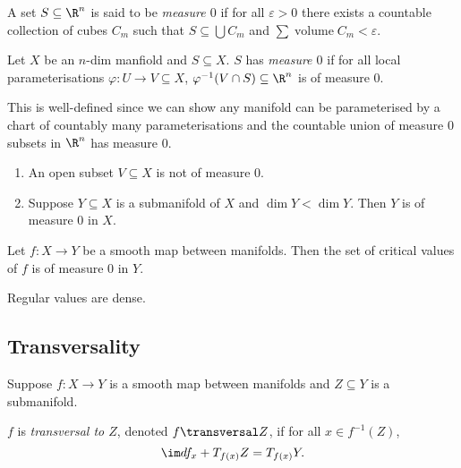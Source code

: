 \documentclass[a4paper]{article}
\begin{document}
\begin{definition}
  A set \(S \subseteq \R^n\) is said to be \emph{measure \(0\)} if for all \(\varepsilon > 0\) there exists a countable collection of cubes \(C_m\) such that \(S \subseteq \bigcup C_m\) and \(\sum \operatorname{volume} C_m < \varepsilon\).
\end{definition}

\begin{definition}
  Let \(X\) be an \(n\)-dim manfiold and \(S \subseteq X\). \(S\) has \emph{measure \(0\)} if for all local parameterisations \(\varphi: U \to V \subseteq X\), \(\varphi^{-1}(V \cap S) \subseteq \R^n\) is of measure \(0\).
\end{definition}

This is well-defined since we can show any manifold can be parameterised by a chart of countably many parameterisations and the countable union of measure \(0\) subsets in \(\R^n\) has measure \(0\).

\begin{remark}\leavevmode
  \begin{enumerate}
  \item An open subset \(V \subseteq X\) is not of measure \(0\).
  \item Suppose \(Y \subseteq X\) is a submanifold of \(X\) and \(\dim Y < \dim Y\). Then \(Y\) is of measure \(0\) in \(X.\)
  \end{enumerate}
\end{remark}

\begin{theorem}
  Let \(f: X \to Y\) be a smooth map between manifolds. Then the set of critical values of \(f\) is of measure \(0\) in \(Y\).
\end{theorem}

\begin{corollary}
  Regular values are dense.
\end{corollary}

\subsection{Transversality}

Suppose \(f: X \to Y\) is a smooth map between manifolds and \(Z \subseteq Y\) is a submanifold.

\begin{definition}[Transversality]
  \(f\) is \emph{transversal to \(Z\)}, denoted \(f \transversal Z\), if for all \(x \in f^{-1}(Z)\),
  \[
    \im df_x + T_{f(x)}Z = T_{f(x)}Y.
  \]
\end{definition}
\end{document}

